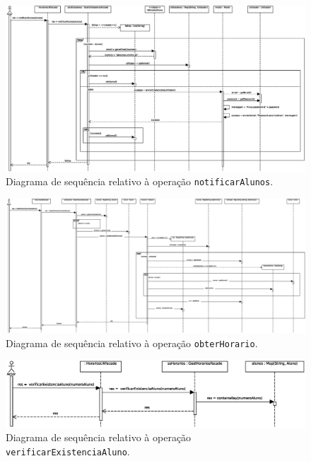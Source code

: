 \documentclass[12pt, a4paper]{article}
\begin{document}
\begin{landscape}
        \begin{figure}[H]
            \centering
            \includegraphics[scale=0.60]{Imagens/Modelos/notificarAlunos.svg.eps}
            \caption{
                Diagrama de sequência relativo à operação \texttt{notificarAlunos}.
            }
        \end{figure}

        \vspace*{\fill}
        \pagebreak
        \vspace*{\fill}

        \begin{figure}[H]
            \centering
            \includegraphics[scale=0.45]{Imagens/Modelos/obterHorario.svg.eps}
            \caption{
                Diagrama de sequência relativo à operação \texttt{obterHorario}.
            }
        \end{figure}

        \vspace*{\fill}
        \pagebreak
        \vspace*{\fill}

        \begin{figure}[H]
            \centering
            \includegraphics[scale=1.0]{Imagens/Modelos/verificarExistenciaAluno.svg.eps}
            \caption{
                Diagrama de sequência relativo à operação \texttt{verificarExistenciaAluno}.
            }
        \end{figure}


\end{landscape}
\end{document}

